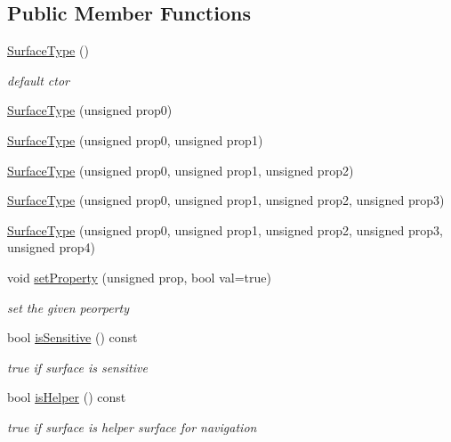 \subsection*{Public Member Functions}
\begin{DoxyCompactItemize}
\item 
\hyperlink{class_d_d_surfaces_1_1_surface_type_a730d529362ea56aba0a47e20b7a017e7}{Surface\+Type} ()
\begin{DoxyCompactList}\small\item\em default c\textquotesingle{}tor \end{DoxyCompactList}\item 
\hyperlink{class_d_d_surfaces_1_1_surface_type_a1eddfb236b06b6d2073b9cf5db598bc8}{Surface\+Type} (unsigned prop0)
\item 
\hyperlink{class_d_d_surfaces_1_1_surface_type_a080fbe4b3790adf465b77f5187440e31}{Surface\+Type} (unsigned prop0, unsigned prop1)
\item 
\hyperlink{class_d_d_surfaces_1_1_surface_type_a1edfc7bc6145d352f1dff360f91b97c0}{Surface\+Type} (unsigned prop0, unsigned prop1, unsigned prop2)
\item 
\hyperlink{class_d_d_surfaces_1_1_surface_type_a14d8c8c9ca24104930ff64b27774b916}{Surface\+Type} (unsigned prop0, unsigned prop1, unsigned prop2, unsigned prop3)
\item 
\hyperlink{class_d_d_surfaces_1_1_surface_type_ac5fb5d83f865a805ea0fdbe799e50e5b}{Surface\+Type} (unsigned prop0, unsigned prop1, unsigned prop2, unsigned prop3, unsigned prop4)
\item 
void \hyperlink{class_d_d_surfaces_1_1_surface_type_aac5ebe16c0c230033f68c4e3f5a349af}{set\+Property} (unsigned prop, bool val=true)
\begin{DoxyCompactList}\small\item\em set the given peorperty \end{DoxyCompactList}\item 
bool \hyperlink{class_d_d_surfaces_1_1_surface_type_a9dbbb4928f16176c6cd3cf183a6662f1}{is\+Sensitive} () const
\begin{DoxyCompactList}\small\item\em true if surface is sensitive \end{DoxyCompactList}\item 
bool \hyperlink{class_d_d_surfaces_1_1_surface_type_a136786219b91481212599fb88d82d59c}{is\+Helper} () const
\begin{DoxyCompactList}\small\item\em true if surface is helper surface for navigation \end{DoxyCompactList}\item 

\end{DoxyCompactItemize}

